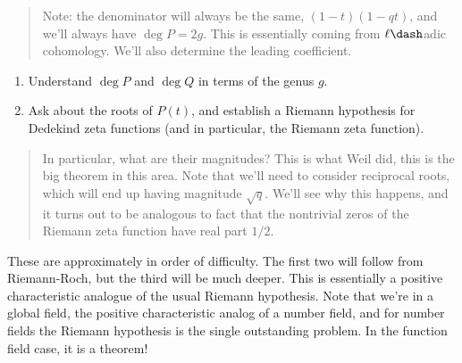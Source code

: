 \begin{quote}
Note: the denominator will always be the same, \((1-t)(1-qt)\), and
we'll always have \(\deg P = 2g\). This is essentially coming from
\(\ell\dash\)adic cohomology. We'll also determine the leading
coefficient.
\end{quote}

\begin{enumerate}
\def\labelenumi{\arabic{enumi}.}
\setcounter{enumi}{1}
\item
  Understand \(\deg P\) and \(\deg Q\) in terms of the genus \(g\).
\item
  Ask about the roots of \(P(t)\), and establish a Riemann hypothesis
  for Dedekind zeta functions (and in particular, the Riemann zeta
  function).
\end{enumerate}

\begin{quote}
In particular, what are their magnitudes? This is what Weil did, this is
the big theorem in this area. Note that we'll need to consider
reciprocal roots, which will end up having magnitude \(\sqrt{q}\). We'll
see why this happens, and it turns out to be analogous to fact that the
nontrivial zeros of the Riemann zeta function have real part \(1/2\).
\end{quote}

These are approximately in order of difficulty. The first two will
follow from Riemann-Roch, but the third will be much deeper. This is
essentially a positive characteristic analogue of the usual Riemann
hypothesis. Note that we're in a global field, the positive
characteristic analog of a number field, and for number fields the
Riemann hypothesis is the single outstanding problem. In the function
field case, it is a theorem!

